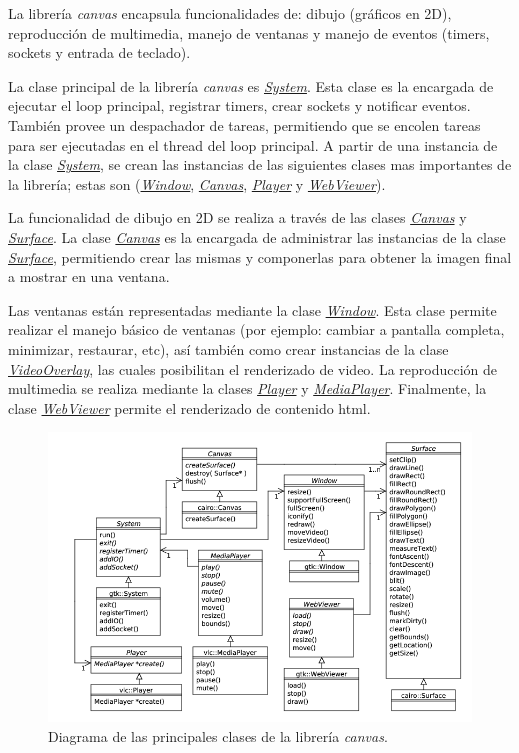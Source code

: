 La librería \emph{canvas} encapsula funcionalidades de: dibujo (gráficos en 2D), reproducción de multimedia, manejo de ventanas y manejo de eventos (timers, sockets y entrada de teclado).
 
La clase principal de la librería \emph{canvas} es \hyperlink{classcanvas_1_1System}{\emph{System}}. Esta clase es la encargada de ejecutar el loop principal, registrar timers, crear sockets y notificar eventos.
También provee un despachador de tareas, permitiendo que se encolen tareas para ser ejecutadas en el thread del loop principal. A partir de una instancia de la clase \hyperlink{classcanvas_1_1System}{\emph{System}}, se crean las instancias de las siguientes
clases mas importantes de la librería; estas son (\hyperlink{classcanvas_1_1Window}{\emph{Window}}, \hyperlink{classcanvas_1_1Canvas}{\emph{Canvas}}, \hyperlink{classcanvas_1_1Player}{\emph{Player}} y \hyperlink{classcanvas_1_1WebViewer}{\emph{WebViewer}}).
 
La funcionalidad de dibujo en 2D se realiza a través de las clases \hyperlink{classcanvas_1_1Canvas}{\emph{Canvas}} y \hyperlink{classcanvas_1_1Surface}{\emph{Surface}}. La clase \hyperlink{classcanvas_1_1Canvas}{\emph{Canvas}} 
es la encargada de administrar las instancias de la clase \hyperlink{classcanvas_1_1Surface}{\emph{Surface}}, permitiendo crear las mismas y componerlas para obtener la imagen final a mostrar en una ventana.

Las ventanas están representadas mediante la clase \hyperlink{classcanvas_1_1Window}{\emph{Window}}. Esta clase permite realizar el manejo 
básico de ventanas (por ejemplo: cambiar a pantalla completa, minimizar, restaurar, etc), así también como crear instancias de la clase \hyperlink{classcanvas_1_1VideoOverlay}{\emph{VideoOverlay}}, las cuales posibilitan el renderizado de video.
La reproducción de multimedia se realiza mediante la clases \hyperlink{classcanvas_1_1Player}{\emph{Player}} y \hyperlink{classcanvas_1_1MediaPlayer}{\emph{MediaPlayer}}. Finalmente, la clase \hyperlink{classcanvas_1_1WebViewer}{\emph{WebViewer}} permite el renderizado de contenido html.

\begin{figure}[h!]
	\centering
	\includegraphics[scale=0.5]{resources/uml-dtv-canvas.jpg}
	\caption{Diagrama de las principales clases de la librería \emph{canvas}.}
\end{figure}

\FloatBarrier
